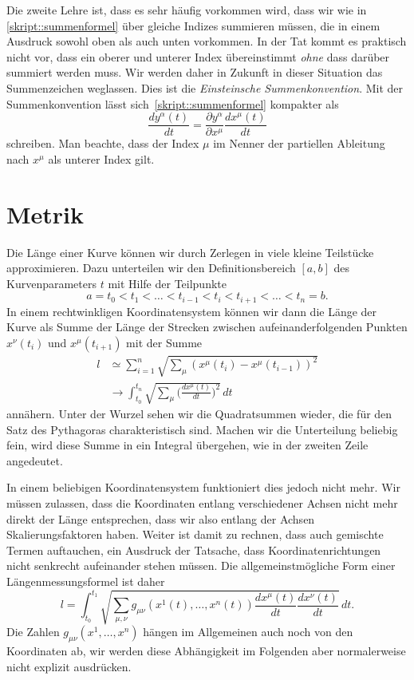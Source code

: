 Die zweite Lehre ist, dass es sehr häufig vorkommen wird, dass wir
wie in 
\eqref{skript::summenformel}
über gleiche Indizes summieren müssen, die in einem Ausdruck sowohl
oben als auch unten vorkommen.
In der Tat kommt es praktisch nicht vor, dass ein oberer und unterer
Index übereinstimmt {\em ohne} dass darüber summiert werden muss.
Wir werden daher in Zukunft in dieser Situation das Summenzeichen weglassen.
Dies ist die {\em Einsteinsche Summenkonvention}.
%
Mit der Summenkonvention lässt sich~\eqref{skript::summenformel} kompakter
als
\begin{equation}
\frac{dy^\alpha(t)}{dt}
=
\frac{\partial y^\alpha}{\partial x^\mu}\frac{dx^\mu(t)}{dt}
\end{equation}
schreiben.
Man beachte, dass der Index $\mu$ im Nenner der partiellen Ableitung nach
$x^\mu$ als unterer Index gilt.

%
%
\section{Metrik%
\label{skript:laengenmessung:section:metrik}}
Die Länge einer Kurve können wir durch Zerlegen in viele kleine Teilstücke
approximieren.
Dazu unterteilen wir den Definitionsbereich $[a,b]$ des Kurvenparameters $t$
mit Hilfe der Teilpunkte
\[
a = t_0 < t_1 < \dots < t_{i-1} < t_i < t_{i+1} < \dots < t_n = b.
\]
In einem rechtwinkligen Koordinatensystem können wir dann die Länge
der Kurve als Summe der Länge der Strecken zwischen aufeinanderfolgenden
Punkten $x^\nu(t_i)$ und $x^\mu(t_{i+1})$ mit der Summe
\begin{align*}
l
&\simeq
\sum_{i=1}^n \sqrt{\sum_{\mu} (x^{\mu}(t_i)-x^{\mu}(t_{i-1}))^2}
\\
&\rightarrow
\int_{t_0}^{t_n} \sqrt{\sum_{\mu}\biggl(\frac{dx^{\mu}(t)}{dt}\biggr)^2}\,dt
\end{align*}
annähern.
Unter der Wurzel sehen wir die Quadratsummen wieder, die für den
Satz des Pythagoras charakteristisch sind.
Machen wir die Unterteilung beliebig fein, wird diese Summe in ein
Integral übergehen, wie in der zweiten Zeile angedeutet.

In einem beliebigen Koordinatensystem funktioniert dies jedoch nicht mehr.
Wir müssen zulassen, dass die Koordinaten entlang verschiedener
Achsen nicht mehr direkt der Länge entsprechen, dass wir also
entlang der Achsen Skalierungsfaktoren haben.
Weiter ist damit zu rechnen, dass auch gemischte Termen auftauchen, ein
Ausdruck der Tatsache, dass Koordinatenrichtungen nicht senkrecht aufeinander
stehen müssen.
Die allgemeinstmögliche Form einer Längenmessungsformel ist daher
\begin{equation}
l
=
\int_{t_0}^{t_1}
\sqrt{\sum_{\mu,\nu} g_{\mu\nu}(x^1(t),\dots,x^n(t)) \frac{dx^{\mu}(t)}{dt}\frac{dx^{\nu}(t)}{dt}}\,dt.
\label{skript:kruemmung:metrikformel}
\end{equation}
Die Zahlen $g_{\mu\nu}(x^1,\dots,x^n)$ hängen im Allgemeinen auch noch von
den Koordinaten ab, wir werden diese Abhängigkeit im Folgenden aber
normalerweise nicht explizit ausdrücken.

